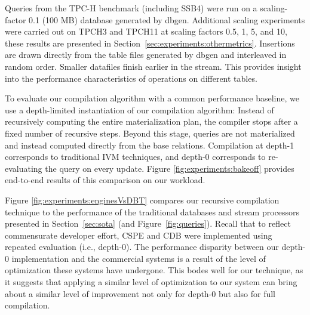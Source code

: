 Queries from the TPC-H benchmark (including SSB4) were run on a scaling-factor 0.1 (100 MB) database generated by dbgen\cite{counciltpc}.  Additional scaling experiments were carried out on TPCH3 and TPCH11 at scaling factors 0.5, 1, 5, and 10, these results are presented in Section~\ref{sec:experiments:othermetrics}.  Insertions are drawn directly from the table files generated by dbgen and interleaved in random order.  Smaller datafiles finish earlier in the stream.  This provides insight into the performance characteristics of operations on different tables.


To evaluate our compilation algorithm with a common performance baseline, we use a depth-limited instantiation of our compilation algorithm: Instead of recursively computing the entire materialization plan, the compiler stops after a fixed number of recursive steps.  Beyond this stage, queries are not materialized and instead computed directly from the base relations.   Compilation at depth-1 corresponds to traditional IVM techniques, and depth-0 corresponds to re-evaluating the query on every update.  Figure \ref{fig:experiments:bakeoff} provides end-to-end results of this comparison on our workload.


Figure \ref{fig:experiments:enginesVsDBT} compares our recursive compilation technique to the performance of the traditional databases and stream processors presented in Section~\ref{sec:sota} (and Figure~\ref{fig:queries}).  Recall that to reflect commensurate developer effort, CSPE and CDB were implemented using repeated evaluation (i.e., depth-0).  The performance disparity between our depth-0 implementation and the commercial systems is a result of the level of optimization these systems have undergone.  This bodes well for our technique, as it suggests that applying a similar level of optimization to our system can bring about a similar level of improvement not only for depth-0 but also for full compilation.

